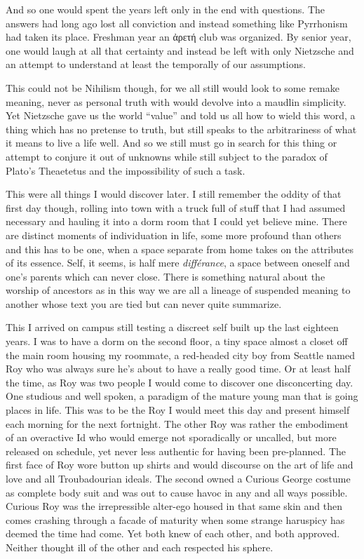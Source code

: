 \documentclass[ebook, 10pt, openright, onecolumn]{memoir}
\newcommand{\textgreek}[1]{\begingroup\fontencoding{LGR}\selectfont#1\endgroup}
\begin{document}
And so one would spent the years left only in the end with questions.  The
answers had long ago lost all conviction and instead something like Pyrrhonism
had taken its place.  Freshman year an \textgreek{ἀρετή} club was organized.  By
senior year, one would laugh at all that certainty and instead be left with only
Nietzsche and an attempt to understand at least the temporally of our
assumptions.

This could not be Nihilism though, for we all still would look to some remake
meaning, never as personal truth with would devolve into a maudlin simplicity.
Yet Nietzsche gave us the world ``value'' and told us all how to wield this
word, a thing which has no pretense to truth, but still speaks to the
arbitrariness of what it means to live a life well.  And so we still must go in
search for this thing or attempt to conjure it out of unknowns while still
subject to the paradox of Plato's Theaetetus and the impossibility of such a
task.

This were all things I would discover later.  I still remember the oddity of
that first day though, rolling into town with a truck full of stuff that I had
assumed necessary and hauling it into a dorm room that I could yet believe mine.
There are distinct moments of individuation in life, some more profound than
others and this has to be one, when a space separate from home takes on the
attributes of its essence.  Self, it seems, is half mere \textit{différance}, a
space between oneself and one's parents which can never close.  There is something
natural about the worship of ancestors as in this way we are all a lineage of
suspended meaning to another whose text you are tied but can never quite
summarize.

This I arrived on campus still testing a discreet self built up the last
eighteen years.  I was to have a dorm on the second floor, a tiny space almost a
closet off the main room housing my roommate, a red-headed city boy from Seattle
named Roy who was always sure he's about to have a really good time.  Or at
least half the time, as Roy was two people I would come to discover one
disconcerting day.  One studious and well spoken, a paradigm of the mature young
man that is going places in life.  This was to be the Roy I would meet this day
and present himself each morning for the next fortnight.  The other Roy was
rather the embodiment of an overactive Id who would emerge not sporadically or
uncalled, but more released on schedule, yet never less authentic for having
been pre-planned.  The first face of Roy wore button up shirts and would
discourse on the art of life and love and all Troubadourian ideals.  The second
owned a Curious George costume as complete body suit and was out to cause havoc
in any and all ways possible.  Curious Roy was the irrepressible alter-ego
housed in that same skin and then comes crashing through a facade of maturity
when some strange haruspicy has deemed the time had come.  Yet both knew of each
other, and both approved.  Neither thought ill of the other and each respected
his sphere.  
\end{document}
